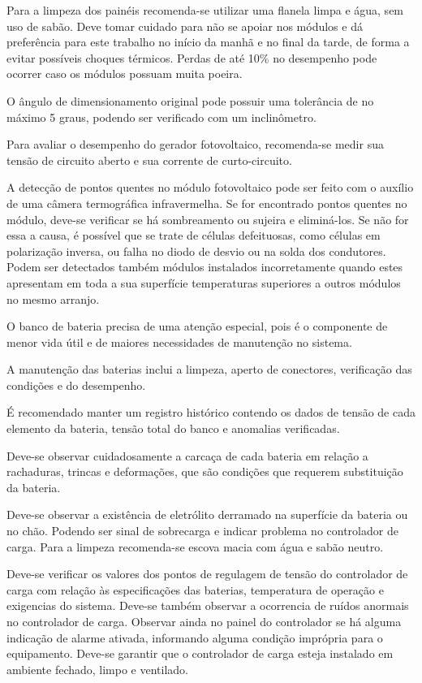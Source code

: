Para a limpeza dos painéis recomenda-se utilizar uma flanela limpa e água, sem uso de sabão. Deve tomar cuidado para não se apoiar nos módulos e dá preferência para este trabalho no início da manhã e no final da tarde, de forma a evitar possíveis choques térmicos. Perdas de até 10\% no desempenho pode ocorrer caso os módulos possuam muita poeira.

O ângulo de dimensionamento original pode possuir uma tolerância de no máximo 5 graus, podendo ser verificado com um inclinômetro.

Para avaliar o desempenho do gerador fotovoltaico, recomenda-se medir sua tensão de circuito aberto e sua corrente de curto-circuito.

A detecção de pontos quentes no módulo fotovoltaico pode ser feito com o auxílio de uma câmera termográfica infravermelha. Se for encontrado pontos quentes no módulo, deve-se verificar se há sombreamento ou sujeira e eliminá-los. Se não for essa a causa, é possível que se trate de células defeituosas, como células em polarização inversa, ou falha no diodo de desvio ou na solda dos condutores. Podem ser detectados também módulos instalados incorretamente quando estes apresentam em toda a sua superfície temperaturas superiores a outros módulos no mesmo arranjo.

O banco de bateria precisa de uma atenção especial, pois é o componente de menor vida útil e de maiores necessidades de manutenção no sistema. 

A manutenção das baterias inclui a limpeza, aperto de conectores, verificação das condições e do desempenho.

É recomendado manter um registro histórico contendo os dados de tensão de cada elemento da bateria, tensão total do banco e anomalias verificadas.

Deve-se observar cuidadosamente a carcaça de cada bateria em relação a rachaduras, trincas e deformações, que são condições que requerem substituição da bateria. 

Deve-se observar a existência de eletrólito derramado na superfície da bateria ou no chão. Podendo ser sinal de sobrecarga e indicar problema no controlador de carga. Para a limpeza recomenda-se escova macia com água e sabão neutro.

Deve-se verificar os valores dos pontos de regulagem de tensão do controlador de carga com relação às especificações das baterias, temperatura de operação e exigencias do sistema. Deve-se  também observar a ocorrencia de ruídos anormais no controlador de carga. Observar ainda no painel do controlador se há alguma indicação de alarme ativada, informando alguma condição imprópria para o equipamento. Deve-se garantir que o controlador de carga esteja instalado em ambiente fechado, limpo e ventilado.

